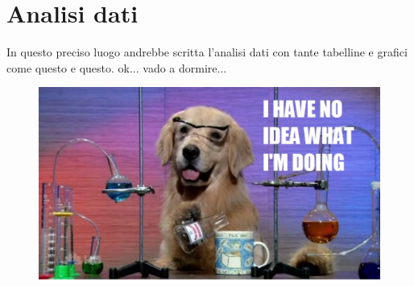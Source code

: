 \section{Analisi dati}

In questo preciso luogo andrebbe scritta l'analisi dati con tante tabelline e grafici come questo e questo. ok... vado a dormire...

\begin{figure}[hbtp]
        \centering
        \includegraphics[scale=0.4]{chem_dog.pdf}
        \end{figure}